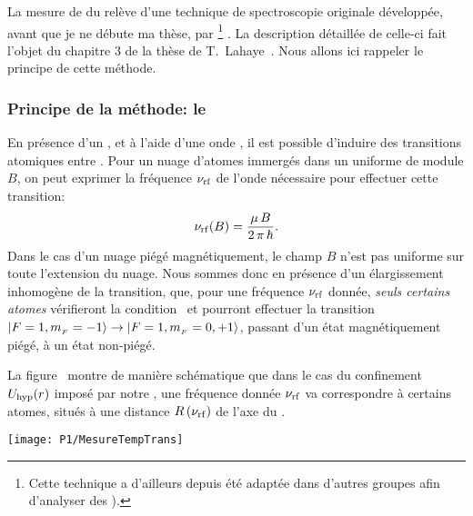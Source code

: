 La mesure de \tempt du \jat relève d'une technique de spectroscopie \rf originale développée, avant que je ne débute ma thèse, par \dgo%
\footnote{Cette technique a d'ailleurs depuis été adaptée dans d'autres groupes afin d'analyser des \becs\cite{FGW07}).}%
. 
La description détaillée de celle-ci fait l'objet du chapitre 3 de la thèse de T.~Lahaye~\cite{TTL}. Nous allons ici rappeler le principe de cette méthode.

	\subsubsection{Principe de la méthode: le \fispse}
	En présence d'un \chm, et à l'aide d'une onde \rf, il est possible d'induire des transitions atomiques entre \snZs. Pour un nuage d'atomes immergés dans un \chm uniforme de module $B$, on peut exprimer la fréquence ${\nu_{\rm rf}}$ de l'onde nécessaire pour effectuer cette transition:%
%
\begin{equation}
	\nurf(B) = \frac{\mu\,B}{2\,\pi\,\hbar}.
	\label{eq:nurfB}
\end{equation}
Dans le cas d'un nuage piégé magnétiquement, le champ $B$ n'est pas uniforme sur toute l'extension du nuage. Nous sommes donc en présence d'un élargissement inhomogène de la transition, \cad que, pour une fréquence ${\nu_{\rm rf}}$ donnée, \emph{seuls certains atomes} vérifieront la condition~ et pourront effectuer la transition ${{\left| { {F=1 , {m_{_F}}=-1} } \right\rangle}} \rightarrow {{\left| { {F=1 , {m_{_F}}=0,+1} } \right\rangle}}$, passant d'un état magnétiquement piégé, à un état non-piégé.%

La figure~ montre de manière schématique que dans le cas du confinement ${U_{\rm hyp}}(r)$ imposé par notre \gm, une fréquence donnée ${\nu_{\rm rf}}$ va correspondre à certains atomes, situés à une distance ${R\left( {\nu_{\rm rf}} \right)}$ de l'axe du \gm. 

\bfig
\texttt{[image: P1/MesureTempTrans]}
\label{fig:MesureTempTrans}
\efig

